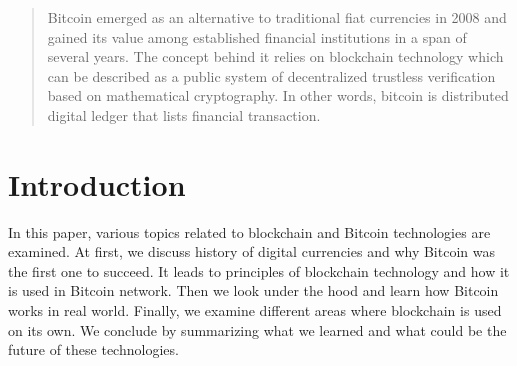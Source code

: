 \documentclass[conference,compsoc]{IEEEtran}
\begin{document}
\begin{abstract}
Bitcoin emerged as an alternative to traditional fiat currencies in 2008 and gained its value among established financial institutions in a span of several years. The concept behind it relies on blockchain technology which can be described as a public system of decentralized trustless verification based on mathematical cryptography. In other words, bitcoin is distributed digital ledger that lists financial transaction. 


\end{abstract}





%
\IEEEpeerreviewmaketitle



\section{Introduction}
In this paper, various topics related to blockchain and Bitcoin technologies are examined. At first, we discuss history of digital currencies and why Bitcoin was the first one to succeed. It leads to principles of blockchain technology and how it is used in Bitcoin network. Then we look under the hood and learn how Bitcoin works in real world. Finally, we examine different areas where blockchain is used on its own. We conclude by summarizing what we learned and what could be the future of these technologies.


%
%
\end{document}
